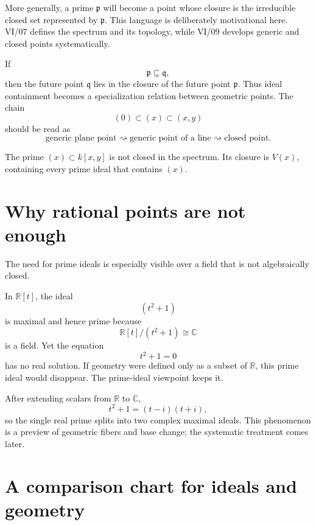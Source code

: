 More generally, a prime \(\mathfrak p\) will become a point whose closure is the irreducible
closed set represented by \(\mathfrak p\).  This language is deliberately motivational
here.  VI/07 defines the spectrum and its topology, while VI/09 develops generic and closed
points systematically.

\begin{remark}
If
\[
\mathfrak p\subseteq\mathfrak q,
\]
then the future point \(\mathfrak q\) lies in the closure of the future point
\(\mathfrak p\).  Thus ideal containment becomes a specialization relation between
geometric points.  The chain
\[
(0)\subset(x)\subset(x,y)
\]
should be read as
\[
\text{generic plane point}
\rightsquigarrow
\text{generic point of a line}
\rightsquigarrow
\text{closed point}.
\]
\end{remark}

\begin{example}\label{ex:vi06-expand-03}
The prime $(x)\subset k[x,y]$ is not closed in the spectrum.  Its closure is $V(x)$, containing every prime ideal that contains $(x)$.
\end{example}
\section{Why rational points are not enough}

The need for prime ideals is especially visible over a field that is not algebraically
closed.

In \(\mathbb R[t]\), the ideal
\[
(t^2+1)
\]
is maximal and hence prime because
\[
\mathbb R[t]/(t^2+1)\cong\mathbb C
\]
is a field.  Yet the equation
\[
t^2+1=0
\]
has no real solution.  If geometry were defined only as a subset of \(\mathbb R\), this
prime ideal would disappear.  The prime-ideal viewpoint keeps it.

After extending scalars from \(\mathbb R\) to \(\mathbb C\),
\[
t^2+1=(t-i)(t+i),
\]
so the single real prime splits into two complex maximal ideals.  This phenomenon is a
preview of geometric fibers and base change; the systematic treatment comes later.



\section{A comparison chart for ideals and geometry}

